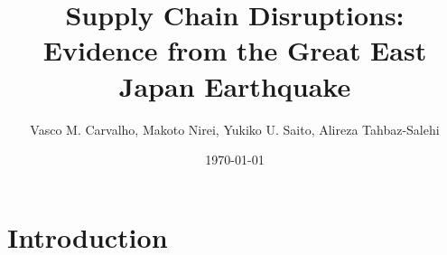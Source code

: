 \documentclass{beamer}
\title{Supply Chain Disruptions: Evidence from the Great East Japan Earthquake}
\author{Vasco M. Carvalho, 
Makoto Nirei, 
Yukiko U. Saito, 
Alireza Tahbaz-Salehi}
\date{\today}
\begin{document}
{
\begin{frame}
\titlepage
\end{frame}
}
\section{Introduction}

\end{document}
